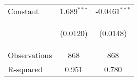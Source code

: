 \begin{table}[htpb]
\begin{center}
{\begin{tabular}{lcc}
Constant &	1.689$^{***}$	&-0.0461$^{***}$ \\
&\begin{footnotesize}	(0.0120)\end{footnotesize}	&\begin{footnotesize}	(0.0148)\end{footnotesize} \\ \midrule
Observations &	868	 & 868 \\
R-squared &	0.951 &	0.780 \\ \bottomrule
\end{tabular}}
\end{center}
\end{table}
